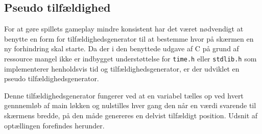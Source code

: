 \subsection*{Pseudo tilfældighed}
For at gøre spillets gameplay mindre konsistent har det været nødvendigt at benytte en form for tilfældighedsgenerator til at bestemme hvor på skærmen en ny forhindring skal starte. Da der i den benyttede udgave af C på grund af ressource mangel ikke er indbygget understøttelse for \texttt{time.h} eller \texttt{stdlib.h} som implementerer henholdsvis tid og tilfældighedsgenerator, er der udviklet en pseudo tilfældighedsgenerator.

Denne tilfældighedsgenerator fungerer ved at en variabel tælles op ved hvert gennnemløb af main løkken og nulstilles hver gang den når en værdi svarende til skærmens bredde, på den måde genereres en delvist tilfældigt position. Udsnit af optællingen forefindes herunder.
